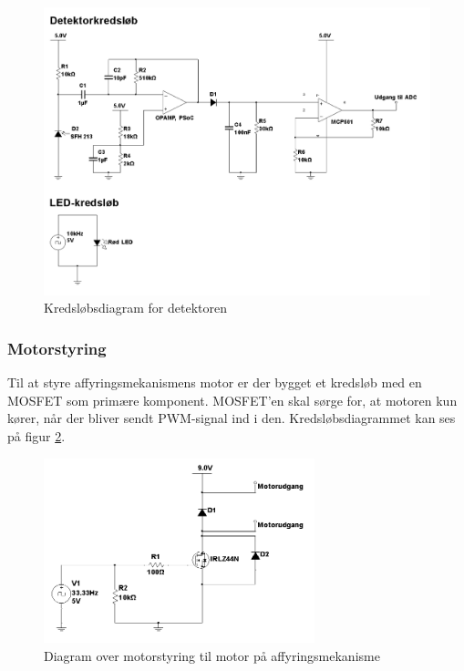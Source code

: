 \begin{figure}[H]
	\centering
	\includegraphics[width=\textwidth]{Afsnit/DesignOgImplementering/images/detektor_tandhjul}
	\caption{Kredsløbsdiagram for detektoren}
	\label{fig:detektortand}
\end{figure}


\subsubsection{Motorstyring}
Til at styre affyringsmekanismens motor er der bygget et kredsløb med en MOSFET som primære komponent. MOSFET'en skal sørge for, at motoren kun kører, når der bliver sendt PWM-signal ind i den. Kredsløbsdiagrammet kan ses på figur \ref{fig:affyringsmotor}. 

\begin{figure}[H]
	\centering
	\includegraphics[width=0.7\textwidth]{Afsnit/DesignOgImplementering/images/affyringsmotor}
	\caption{Diagram over motorstyring til motor på affyringsmekanisme}
	\label{fig:affyringsmotor}
\end{figure}

